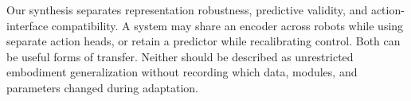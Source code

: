 Our synthesis separates representation robustness, predictive validity, and action-interface compatibility. A system may share an encoder across robots while using separate action heads, or retain a predictor while recalibrating control. Both can be useful forms of transfer. Neither should be described as unrestricted embodiment generalization without recording which data, modules, and parameters changed during adaptation.
